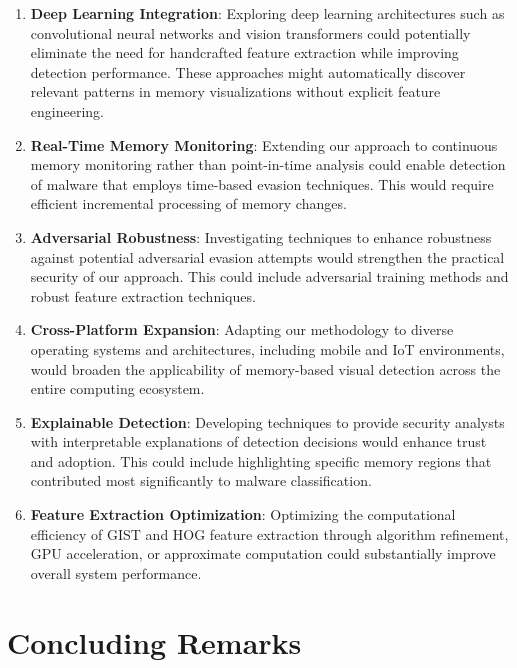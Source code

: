 \begin{enumerate}
    \item \textbf{Deep Learning Integration}: Exploring deep learning architectures such as convolutional neural networks and vision transformers could potentially eliminate the need for handcrafted feature extraction while improving detection performance. These approaches might automatically discover relevant patterns in memory visualizations without explicit feature engineering.
    
    \item \textbf{Real-Time Memory Monitoring}: Extending our approach to continuous memory monitoring rather than point-in-time analysis could enable detection of malware that employs time-based evasion techniques. This would require efficient incremental processing of memory changes.
    
    \item \textbf{Adversarial Robustness}: Investigating techniques to enhance robustness against potential adversarial evasion attempts would strengthen the practical security of our approach. This could include adversarial training methods and robust feature extraction techniques.
    
    \item \textbf{Cross-Platform Expansion}: Adapting our methodology to diverse operating systems and architectures, including mobile and IoT environments, would broaden the applicability of memory-based visual detection across the entire computing ecosystem.
    
    \item \textbf{Explainable Detection}: Developing techniques to provide security analysts with interpretable explanations of detection decisions would enhance trust and adoption. This could include highlighting specific memory regions that contributed most significantly to malware classification.
    
    \item \textbf{Feature Extraction Optimization}: Optimizing the computational efficiency of GIST and HOG feature extraction through algorithm refinement, GPU acceleration, or approximate computation could substantially improve overall system performance.
\end{enumerate}

\section{Concluding Remarks}

